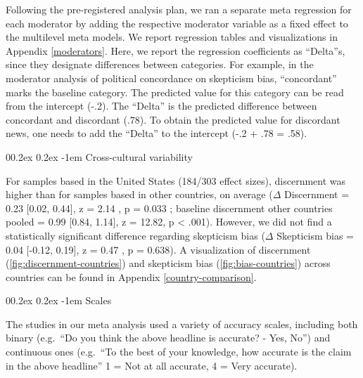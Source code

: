 \documentclass[
  man]{apa6}
\makeatletter
\let\oldparagraph\paragraph
\renewcommand{\paragraph}{
    \@ifstar
      \xxxParagraphStar
      \xxxParagraphNoStar
  }
\newcommand{\xxxParagraphStar}[1]{\oldparagraph*{#1}\mbox{}}
\newcommand{\xxxParagraphNoStar}[1]{\oldparagraph{#1}\mbox{}}
\renewcommand{\paragraph}{\@startsection{paragraph}{4}{\parindent}%
  {0\baselineskip \@plus 0.2ex \@minus 0.2ex}%
  {-1em}%
  {\normalfont\normalsize\bfseries\itshape\typesectitle}}
\makeatother
\begin{document}
Following the pre-registered analysis plan, we ran a separate meta regression for each moderator by adding the respective moderator variable as a fixed effect to the multilevel meta models. We report regression tables and visualizations in Appendix \ref{moderators}. Here, we report the regression coefficients as ``Delta''s, since they designate differences between categories. For example, in the moderator analysis of political concordance on skepticism bias, ``concordant'' marks the baseline category. The predicted value for this category can be read from the intercept (-.2). The ``Delta'' is the predicted difference between concordant and discordant (.78). To obtain the predicted value for discordant news, one needs to add the ``Delta'' to the intercept (-.2 + .78 = .58).

\paragraph{Cross-cultural variability}\label{cross-cultural-variability}

For samples based in the United States (184/303 effect sizes), discernment was higher than for samples based in other countries, on average (\(\Delta\) Discernment = 0.23 {[}0.02, 0.44{]}, z = 2.14 , p = 0.033 ; baseline discernment other countries pooled = 0.99 {[}0.84, 1.14{]}, z = 12.82, p \textless{} .001). However, we did not find a statistically significant difference regarding skepticism bias (\(\Delta\) Skepticism bias = 0.04 {[}-0.12, 0.19{]}, z = 0.47 , p = 0.638). A visualization of discernment (\ref{fig:discernment-countries}) and skepticism bias (\ref{fig:bias-countries}) across countries can be found in Appendix \ref{country-comparison}.

\paragraph{Scales}\label{scales}

The studies in our meta analysis used a variety of accuracy scales, including both binary (e.g.~``Do you think the above headline is accurate? - Yes, No'') and continuous ones (e.g.~``To the best of your knowledge, how accurate is the claim in the above headline'' 1 = Not at all accurate, 4 = Very accurate).
\end{document}
